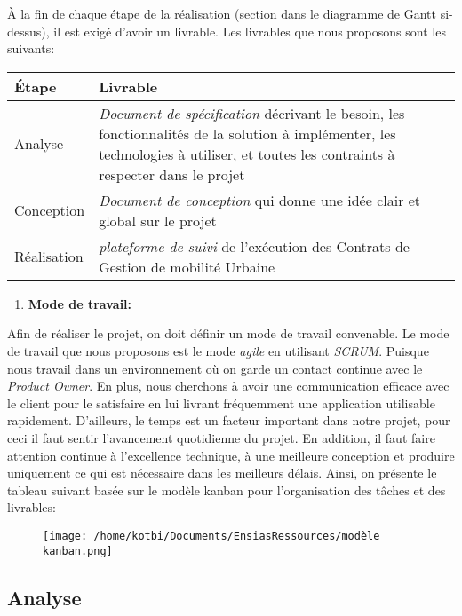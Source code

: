 \documentclass[
]{article}
\begin{document}
À la fin de chaque étape de la réalisation (section dans le diagramme de
Gantt si-dessus), il est exigé d'avoir un livrable. Les livrables que
nous proposons sont les suivants:

\begin{longtable}[]{@{}ll@{}}
\toprule
Étape & Livrable\tabularnewline
\midrule
\endhead
Analyse & \emph{Document de spécification} décrivant le besoin, les
fonctionnalités de la solution à implémenter, les technologies à
utiliser, et toutes les contraints à respecter dans le
projet\tabularnewline
Conception & \emph{Document de conception} qui donne une idée clair et
global sur le projet\tabularnewline
Réalisation & \emph{plateforme de suivi} de l'exécution des Contrats de
Gestion de mobilité Urbaine\tabularnewline
\bottomrule
\end{longtable}

\begin{enumerate}
\def\labelenumi{\arabic{enumi}.}
\item
  \textbf{Mode de travail:}
\end{enumerate}

Afin de réaliser le projet, on doit définir un mode de travail
convenable. Le mode de travail que nous proposons est le mode
\emph{agile} en utilisant \emph{SCRUM}. Puisque nous travail dans un
environnement où on garde un contact continue avec le \emph{Product
Owner}. En plus, nous cherchons à avoir une communication efficace avec
le client pour le satisfaire en lui livrant fréquemment une application
utilisable rapidement. D'ailleurs, le temps est un facteur important
dans notre projet, pour ceci il faut sentir l'avancement quotidienne du
projet. En addition, il faut faire attention continue à l'excellence
technique, à une meilleure conception et produire uniquement ce qui est
nécessaire dans les meilleurs délais. Ainsi, on présente le tableau
suivant basée sur le modèle kanban pour l'organisation des tâches et des
livrables:

\begin{figure}
\centering
\texttt{[image: /home/kotbi/Documents/EnsiasRessources/modèle kanban.png]}
\caption{}
\end{figure}

\hypertarget{analyse}{%
\subsection{Analyse}\label{analyse}}
\end{document}
